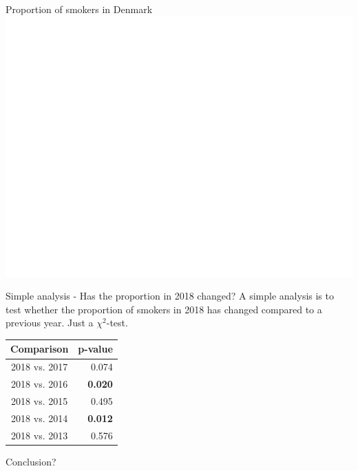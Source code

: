 \documentclass[ignorenonframetext,xcolor=pdflatex,table,dvipsnames,serif]{beamer}
\begin{document}
\begin{frame}{Proportion of smokers in Denmark}
\center\includegraphics[scale=0.5]{smokersData}
\end{frame}

\begin{frame}{Simple analysis - Has the proportion in 2018 changed?}
A simple analysis is to test whether the proportion of smokers in 2018 has changed compared to a previous year. Just a $\chi^2$-test.

\begin{table}
\center
\begin{tabular}{c|r|}
Comparison & p-value\\\hline
2018 vs. 2017 & 0.074\\
2018 vs. 2016 & \textbf{0.020}\\
2018 vs. 2015 & 0.495\\
2018 vs. 2014 & \textbf{0.012}\\
2018 vs. 2013 & 0.576\\
\end{tabular}
\end{table}

\vspace{0.5cm}

Conclusion?
\end{frame}
\end{document}
